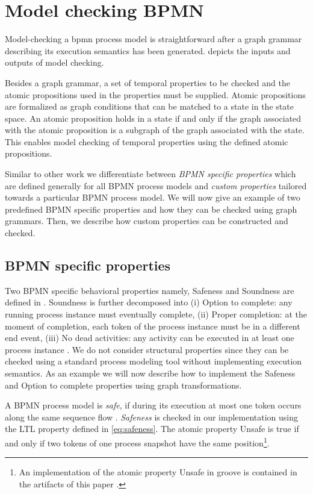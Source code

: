 \documentclass[adraft, copyright, creativecommons]{eptcs} %
\begin{document}
\section{Model checking BPMN} \label{sec:modelChecking}

Model-checking a \gls*{bpmn} process model is straightforward after a graph grammar describing its execution semantics has been generated.
 depicts the inputs and outputs of model checking.

Besides a graph grammar, a set of temporal properties to be checked and the atomic propositions used in the properties must be supplied.
Atomic propositions are formalized as graph conditions that can be matched to a state in the state space.
An atomic proposition holds in a state if and only if the graph associated with the atomic proposition is a subgraph of the graph associated with the state. %
This enables model checking of temporal properties using the defined atomic propositions.

Similar to other work we differentiate between \emph{BPMN specific properties} which are defined generally for all BPMN process models and \emph{custom properties} tailored towards a particular BPMN process model.
We will now give an example of two predefined BPMN specific properties and how they can be checked using graph grammars.
Then, we describe how custom properties can be constructed and checked.

\subsection{BPMN specific properties}
Two BPMN specific behavioral properties namely, Safeness and Soundness are defined in \cite{corradiniClassificationBPMNCollaborations2018}.
Soundness is further decomposed into (i) Option to complete: any running process instance must eventually complete, (ii) Proper completion: at the moment of completion, each token of the process instance must be in a different end event, (iii) No dead activities: any activity can be executed in at least one process instance \cite{corradiniClassificationBPMNCollaborations2018}.
We do not consider structural properties since they can be checked using a standard process modeling tool without implementing execution semantics.
As an example we will now describe how to implement the Safeness and Option to complete properties using graph transformations.

A BPMN process model is \emph{safe}, if during its execution at most one token occurs along the same sequence flow \cite{corradiniClassificationBPMNCollaborations2018}.
\emph{Safeness} is checked in our implementation using the LTL property defined in \eqref{eq:safeness}.
The atomic property \textsf{Unsafe} is true if and only if two tokens of one process snapshot have the same position\footnote{An implementation of the atomic property \textsf{Unsafe} in groove is contained in the artifacts of this paper \cite{ArtifactsTERMGRAPH2022}.}.
\end{document}
